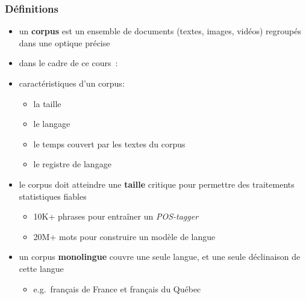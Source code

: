 \begin{frame}[allowframebreaks]
\frametitle{Définitions}


\begin{itemize} \itemsep0.8em
    \item un \textbf{corpus} est un ensemble de documents (textes, images, 
          vidéos) regroupés dans une optique précise
    \item dans le cadre de ce cours~: \alert{}
    \item caractéristiques d'un corpus:
    \begin{itemize}
        \item la taille
        \item le langage
        \item le temps couvert par les textes du corpus
        \item le registre de langage
    \end{itemize}
\end{itemize}

\framebreak


\begin{itemize} \itemsep0.8em
    \item le corpus doit atteindre une \textbf{taille} critique pour permettre 
          des traitements statistiques fiables
    \begin{itemize}
        \item 10K+ phrases pour entraîner un \textit{POS-tagger}
        \item 20M+ mots pour construire un modèle de langue
    \end{itemize}
    \item un corpus \textbf{monolingue} couvre une seule langue, et une seule 
          déclinaison de cette langue
    \begin{itemize}
        \item e.g.~français de France et français du Québec
    \end{itemize}
\end{itemize}

\framebreak


\end{frame}
